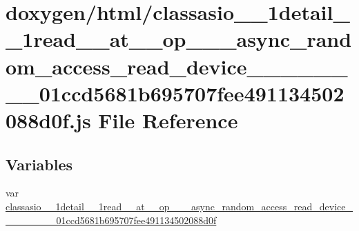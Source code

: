 \hypertarget{classasio__1__1detail__1__1read____at____op__3__01__async__random__access__read__device__00__01_b0cf066b5be2821834538bcd332fc7e3}{}\section{doxygen/html/classasio\+\_\+\_\+1detail\+\_\+\_\+1read\+\_\+\+\_\+at\+\_\+\+\_\+op\+\_\+\_\+\_\+async\+\_\+random\+\_\+access\+\_\+read\+\_\+device\+\_\+\_\+\_\+\_\+\_\+\_\+\_\+\_\+01ccd5681b695707fee491134502088d0f.js File Reference}
\label{classasio__1__1detail__1__1read____at____op__3__01__async__random__access__read__device__00__01_b0cf066b5be2821834538bcd332fc7e3}
\subsection*{Variables}
\begin{DoxyCompactItemize}
\item 
var \hyperlink{classasio__1__1detail__1__1read____at____op__3__01__async__random__access__read__device__00__01_b0cf066b5be2821834538bcd332fc7e3_a244fdc7eafe564d5a28b164db5c6790d}{classasio\+\_\+\_\+1detail\+\_\+\_\+1read\+\_\+\+\_\+at\+\_\+\+\_\+op\+\_\+\_\+\_\+async\+\_\+random\+\_\+access\+\_\+read\+\_\+device\+\_\+\_\+\_\+\_\+\_\+\_\+\_\+\_\+01ccd5681b695707fee491134502088d0f}
\end{DoxyCompactItemize}


